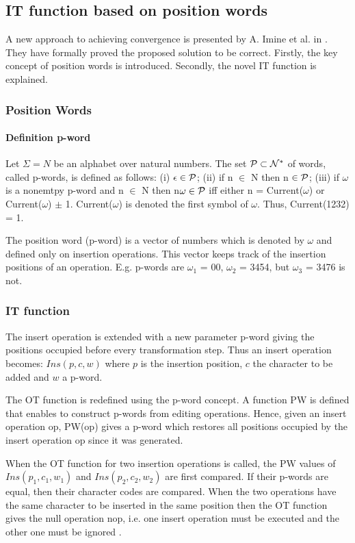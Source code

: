 \subsection{IT function based on position words}
\label{otf:imor}

A new approach to achieving convergence is presented by A. Imine et al. in \cite{imine04}. They have formally proved the proposed solution to be correct. Firstly, the key concept of position words is introduced. Secondly, the novel IT function is explained.

\subsubsection{Position Words}
\paragraph{Definition p-word} Let $\Sigma = N$ be an alphabet over natural numbers. The set $\cal P \subset N^*$ of words, called p-words, is defined as follows: (i) $\epsilon \in \cal P$; (ii) if n $\in$ N then n $\in \cal P$; (iii) if $\omega$ is a nonemtpy p-word and n $\in$ N then n$\omega \in \cal P$ iff either n = Current($\omega$) or Current($\omega$) $\pm$ 1. Current($\omega$) is denoted the first symbol of $\omega$. Thus, Current(1232) = 1.

The position word (p-word) is a vector of numbers which is denoted by $\omega$ and defined only on insertion operations. This vector keeps track of the insertion positions of an operation. E.g. p-words are $\omega_{1}$ = 00, $\omega_{2}$ = 3454, but $\omega_{3}$ = 3476 is not. 

\subsubsection{IT function}
The insert operation is extended with a new parameter p-word giving the positions occupied before every transformation step. Thus an insert operation becomes: $Ins(p,c,w)$ where $p$ is the insertion position, $c$ the character to be added and $w$ a p-word.

The OT function is redefined using the p-word concept. A function PW is defined that enables to construct p-words from editing operations. Hence, given an insert operation op, PW(op) gives a p-word which restores all positions occupied by the insert operation op since it was generated. 

When the OT function for two insertion operations is called, the PW values of $Ins(p_1,c_1,w_1)$ and $Ins(p_2,c_2,w_2)$ are first compared. If their p-words are equal, then their character codes are compared. When the two operations have the same character to be inserted in the same position then the OT function gives the null operation nop, i.e. one insert operation must be executed and the other one must be ignored \cite{suleiman98}.

